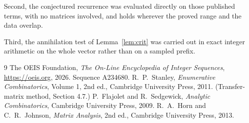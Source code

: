 \documentclass[11pt,a4paper]{article}
\theoremstyle{plain}
\theoremstyle{definition}
\begin{document}
Second, the conjectured recurrence was evaluated directly on those published terms, with no
matrices involved, and holds wherever the proved range and the data overlap.

Third, the annihilation test of Lemma~\ref{lem:crit} was carried out in exact integer
arithmetic on the whole vector rather than on a sampled prefix.

\begin{thebibliography}{9}
 The OEIS Foundation, \emph{The On-Line Encyclopedia of Integer
Sequences}, \url{https://oeis.org}, 2026. Sequence A234680.
 R.~P.~Stanley, \emph{Enumerative Combinatorics}, Volume 1, 2nd ed.,
Cambridge University Press, 2011. (Transfer-matrix method, Section 4.7.)
 P.~Flajolet and R.~Sedgewick, \emph{Analytic Combinatorics}, Cambridge
University Press, 2009.
 R.~A.~Horn and C.~R.~Johnson, \emph{Matrix Analysis}, 2nd ed., Cambridge
University Press, 2013.
\end{thebibliography}
\end{document}
